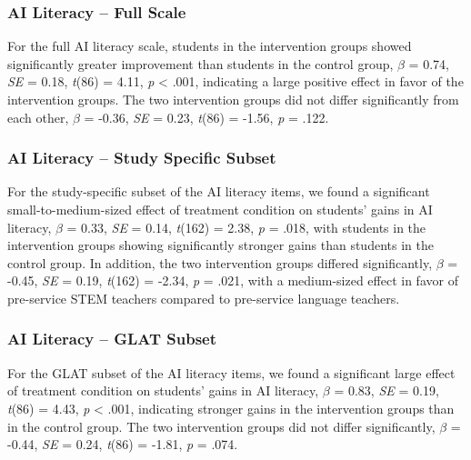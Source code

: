\documentclass[
  letterpaper,
  DIV=11,
  numbers=noendperiod]{scrartcl}
\begin{document}
\subsubsection{AI Literacy -- Full Scale}\label{ai-literacy-full-scale}

For the full AI literacy scale, students in the intervention groups
showed significantly greater improvement than students in the control
group, \(\beta\) = 0.74, \emph{SE} = 0.18, \emph{t}(86) = 4.11, \emph{p}
\textless{} .001, indicating a large positive effect in favor of the
intervention groups. The two intervention groups did not differ
significantly from each other, \(\beta\) = -0.36, \emph{SE} = 0.23,
\emph{t}(86) = -1.56, \emph{p} = .122.

\subsubsection{AI Literacy -- Study Specific
Subset}\label{ai-literacy-study-specific-subset}

For the study-specific subset of the AI literacy items, we found a
significant small-to-medium-sized effect of treatment condition on
students' gains in AI literacy, \(\beta\) = 0.33, \emph{SE} = 0.14,
\emph{t}(162) = 2.38, \emph{p} = .018, with students in the intervention
groups showing significantly stronger gains than students in the control
group. In addition, the two intervention groups differed significantly,
\(\beta\) = -0.45, \emph{SE} = 0.19, \emph{t}(162) = -2.34, \emph{p} =
.021, with a medium-sized effect in favor of pre-service STEM teachers
compared to pre-service language teachers.

\subsubsection{AI Literacy -- GLAT
Subset}\label{ai-literacy-glat-subset}

For the GLAT subset of the AI literacy items, we found a significant
large effect of treatment condition on students' gains in AI literacy,
\(\beta\) = 0.83, \emph{SE} = 0.19, \emph{t}(86) = 4.43, \emph{p}
\textless{} .001, indicating stronger gains in the intervention groups
than in the control group. The two intervention groups did not differ
significantly, \(\beta\) = -0.44, \emph{SE} = 0.24, \emph{t}(86) =
-1.81, \emph{p} = .074.
\end{document}
